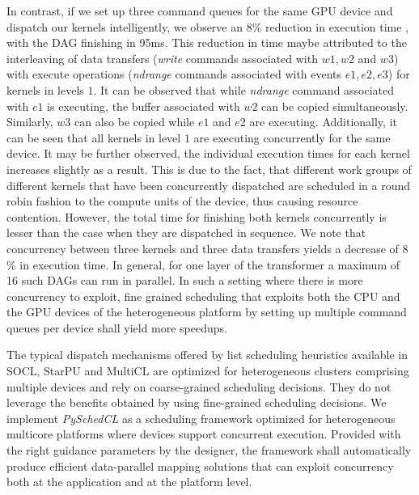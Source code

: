 	\par In contrast, if we set up three command queues for the same GPU device and dispatch our kernels intelligently, we observe an $8\%$ reduction in execution time , with the DAG finishing in 95ms. This reduction in time maybe attributed to the interleaving of data transfers (\textit{write} commands associated with $w1,w2$ and $w3$) with execute operations (\textit{ndrange} commands associated with events $e1,e2,e3$)  for kernels in levels $1$. It can be observed that while \textit{ndrange} command associated with $e1$ is executing, the buffer associated with $w2$ can be copied simultaneously. Similarly, $w3$ can also be copied while $e1$ and $e2$ are executing. Additionally, it can be seen that all kernels in level $1$ are  executing concurrently for the same device. It may be further observed, the individual execution times for each kernel increases slightly as a result. This is due to the fact, that different work groups of different kernels that have been concurrently dispatched  are scheduled in a round robin fashion to the compute units of the device, thus causing resource contention. However, the total time for finishing both kernels concurrently is lesser than the case when they are dispatched in sequence. We note that concurrency between three kernels and three data transfers  yields a decrease of 8 \% in execution time. In general, for one layer of the transformer a maximum of 16 such DAGs can run in parallel. In such a setting where there is more concurrency to exploit, fine grained scheduling that exploits both the CPU and the GPU devices of the heterogeneous platform by setting up multiple command queues per device shall yield more speedups.
	
	\par The typical dispatch mechanisms offered by list scheduling heuristics available in SOCL, StarPU and MultiCL are optimized for heterogeneous clusters comprising multiple devices and rely on coarse-grained scheduling decisions. They do not leverage the benefits obtained by using fine-grained scheduling decisions. We implement {\em PySchedCL} as a scheduling framework optimized for heterogeneous multicore platforms where devices support concurrent execution. Provided with the right guidance parameters by the designer, the framework shall automatically produce efficient data-parallel mapping solutions that can exploit concurrency both at the application and at the platform level.


